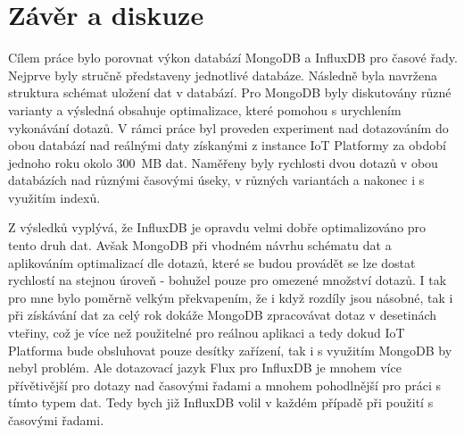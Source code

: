 \documentclass{article}
\begin{document}
\section{Závěr a diskuze}
Cílem práce bylo porovnat výkon databází MongoDB a InfluxDB pro časové řady. Nejprve byly stručně představeny jednotlivé databáze. Následně byla navržena struktura schémat uložení dat v databází. Pro MongoDB byly diskutovány různé varianty a výsledná obsahuje optimalizace, které pomohou s urychlením vykonávání dotazů. V rámci práce byl proveden experiment nad dotazováním do obou databází nad reálnými daty získanými z instance IoT Platformy za období jednoho roku okolo 300~MB dat. Naměřeny byly rychlosti dvou dotazů v obou databázích nad různými časovými úseky, v různých variantách a nakonec i s využitím indexů. 

Z výsledků vyplývá, že InfluxDB je opravdu velmi dobře optimalizováno pro tento druh dat. Avšak MongoDB při vhodném návrhu schématu dat a aplikováním optimalizací dle dotazů, které se budou provádět se lze dostat rychlostí na stejnou úroveň - bohužel pouze pro omezené množství dotazů. I tak pro mne bylo poměrně velkým překvapením, že i když rozdíly jsou násobné, tak i při získávání dat za celý rok dokáže MongoDB zpracovávat dotaz v desetinách vteřiny, což je více než použitelné pro reálnou aplikaci a tedy dokud IoT Platforma bude obsluhovat pouze desítky zařízení, tak i s využitím MongoDB by nebyl problém. Ale dotazovací jazyk Flux pro InfluxDB je mnohem více přívětivější pro dotazy nad časovými řadami a mnohem pohodlnější pro práci s tímto typem dat. Tedy bych již InfluxDB volil v každém případě při použití s časovými řadami.
\end{document}
